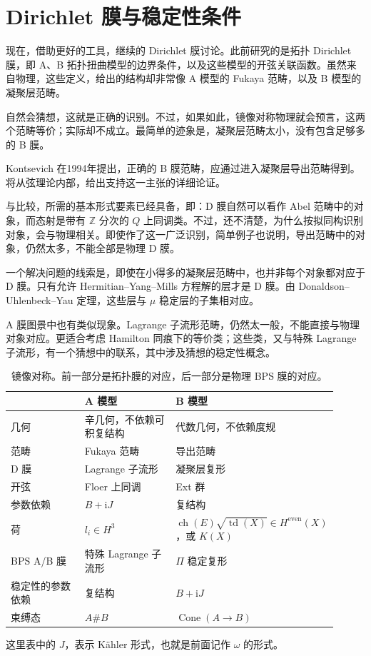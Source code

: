 \chapter{Dirichlet 膜与稳定性条件}\label{chap:5}

现在，借助更好的工具，继续的 Dirichlet 膜讨论。此前研究的是拓扑 Dirichlet 膜，即 A、B 拓扑扭曲模型的边界条件，以及这些模型的开弦关联函数。虽然来自物理，这些定义，给出的结构却非常像 A 模型的 Fukaya 范畴，以及 B 模型的凝聚层范畴。

自然会猜想，这就是正确的识别。不过，如果如此，镜像对称物理就会预言，这两个范畴等价；实际却不成立。最简单的迹象是，凝聚层范畴太小，没有包含足够多的 B 膜。

Kontsevich 在1994年提出，正确的 B 膜范畴，应通过进入凝聚层导出范畴得到。将从弦理论内部，给出支持这一主张的详细论证。

与比较，所需的基本形式要素已经具备，即：D 膜自然可以看作 Abel 范畴中的对象，而态射是带有 $\mathbb{Z}$ 分次的 $Q$ 上同调类。不过，还不清楚，为什么按拟同构识别对象，会与物理相关。即使作了这一广泛识别，简单例子也说明，导出范畴中的对象，仍然太多，不能全部是物理 D 膜。

一个解决问题的线索是，即使在小得多的凝聚层范畴中，也并非每个对象都对应于 D 膜。只有允许 Hermitian--Yang--Mills 方程解的层才是 D 膜。由 Donaldson--Uhlenbeck--Yau 定理，这些层与 $\mu$ 稳定层的子集相对应。

A 膜图景中也有类似现象。Lagrange 子流形范畴，仍然太一般，不能直接与物理对象对应。更适合考虑 Hamilton 同痕下的等价类；这些类，又与特殊 Lagrange 子流形，有一个猜想中的联系，其中涉及猜想的稳定性概念。
\begin{table}[H]
\centering
\caption{镜像对称。前一部分是拓扑膜的对应，后一部分是物理 BPS 膜的对应。}\label{tab:5.1}
\begin{tabular}{@{}p{0.25\linewidth}p{0.30\linewidth}p{0.36\linewidth}@{}}
\toprule
 & A 模型 & B 模型\\
\midrule
几何 & 辛几何，不依赖可积复结构 & 代数几何，不依赖度规\\
范畴 & Fukaya 范畴 & 导出范畴\\
D 膜 & Lagrange 子流形 & 凝聚层复形\\
开弦 & Floer 上同调 & Ext 群\\
参数依赖 & $B+\mathrm{i}J$ & 复结构\\
荷 & $l_i\in H^3$ & $\operatorname{ch}(E)\sqrt{\operatorname{td}(X)}\in H^{\mathrm{even}}(X)$，或 $K(X)$\\
\midrule
BPS A/B 膜 & 特殊 Lagrange 子流形 & $\Pi$ 稳定复形\\
稳定性的参数依赖 & 复结构 & $B+\mathrm{i}J$\\
束缚态 & $A\#B$ & $\operatorname{Cone}(A\to B)$\\
\bottomrule
\end{tabular}
\end{table}
这里表中的 $J$，表示 K\"ahler 形式，也就是前面记作 $\omega$ 的形式。

